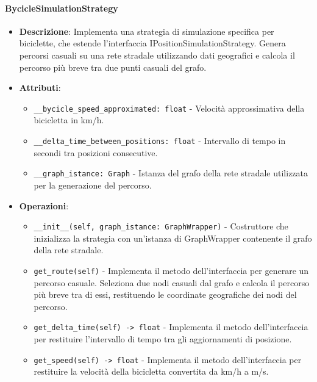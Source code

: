 \documentclass[10pt]{article}
\begin{document}
    \paragraph{BycicleSimulationStrategy}
    \begin{itemize} 
    \item \textbf{Descrizione}: Implementa una strategia di simulazione specifica per biciclette, che estende l'interfaccia IPositionSimulationStrategy. Genera percorsi casuali su una rete stradale utilizzando dati geografici e calcola il percorso più breve tra due punti casuali del grafo.
    \item \textbf{Attributi}:
    \begin{itemize}
        \item \texttt{\_\_bycicle\_speed\_approximated: float} - Velocità approssimativa della bicicletta in km/h.
        \item \texttt{\_\_delta\_time\_between\_positions: float} - Intervallo di tempo in secondi tra posizioni consecutive.
        \item \texttt{\_\_graph\_istance: Graph} - Istanza del grafo della rete stradale utilizzata per la generazione del percorso.
    \end{itemize}
    
    \item \textbf{Operazioni}:
    \begin{itemize}
        \item \texttt{\_\_init\_\_(self, graph\_istance: GraphWrapper)} - Costruttore che inizializza la strategia con un'istanza di GraphWrapper contenente il grafo della rete stradale.
        
        \item \texttt{get\_route(self)} - Implementa il metodo dell'interfaccia per generare un percorso casuale. Seleziona due nodi casuali dal grafo e calcola il percorso più breve tra di essi, restituendo le coordinate geografiche dei nodi del percorso.
        
        \item \texttt{get\_delta\_time(self) -> float} - Implementa il metodo dell'interfaccia per restituire l'intervallo di tempo tra gli aggiornamenti di posizione.
        
        \item \texttt{get\_speed(self) -> float} - Implementa il metodo dell'interfaccia per restituire la velocità della bicicletta convertita da km/h a m/s.
    \end{itemize}
    \end{itemize}
\end{document}
